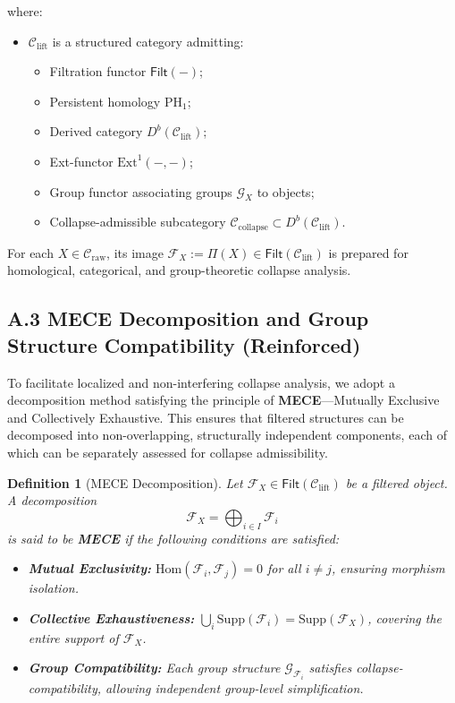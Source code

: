 \documentclass[11pt]{article}
\newtheorem{definition}[theorem]{Definition}
\begin{document}
where:

\begin{itemize}
    \item \( \mathcal{C}_{\mathrm{lift}} \) is a structured category admitting:
    \begin{itemize}
        \item Filtration functor \( \mathsf{Filt}(-) \);
        \item Persistent homology \( \mathrm{PH}_1 \);
        \item Derived category \( D^b(\mathcal{C}_{\mathrm{lift}}) \);
        \item Ext-functor \( \mathrm{Ext}^1(-, -) \);
        \item Group functor associating groups \( \mathcal{G}_X \) to objects;
        \item Collapse-admissible subcategory \( \mathcal{C}_{\mathrm{collapse}} \subset D^b(\mathcal{C}_{\mathrm{lift}}) \).
    \end{itemize}
\end{itemize}

For each \( X \in \mathcal{C}_{\mathrm{raw}} \), its image \( \mathcal{F}_X := \Pi(X) \in \mathsf{Filt}(\mathcal{C}_{\mathrm{lift}}) \) is prepared for homological, categorical, and group-theoretic collapse analysis.

\subsection*{A.3 MECE Decomposition and Group Structure Compatibility (Reinforced)}

To facilitate localized and non-interfering collapse analysis, we adopt a decomposition method satisfying the principle of \textbf{MECE}—Mutually Exclusive and Collectively Exhaustive. This ensures that filtered structures can be decomposed into non-overlapping, structurally independent components, each of which can be separately assessed for collapse admissibility.

\begin{definition}[MECE Decomposition]
Let \( \mathcal{F}_X \in \mathsf{Filt}(\mathcal{C}_{\mathrm{lift}}) \) be a filtered object. A decomposition 
\[
\mathcal{F}_X = \bigoplus_{i \in I} \mathcal{F}_i
\]
is said to be \textbf{MECE} if the following conditions are satisfied:
\begin{itemize}
    \item \textbf{Mutual Exclusivity:} \( \mathrm{Hom}(\mathcal{F}_i, \mathcal{F}_j) = 0 \) for all \( i \neq j \), ensuring morphism isolation.
    \item \textbf{Collective Exhaustiveness:} \( \bigcup_i \mathrm{Supp}(\mathcal{F}_i) = \mathrm{Supp}(\mathcal{F}_X) \), covering the entire support of \( \mathcal{F}_X \).
    \item \textbf{Group Compatibility:} Each group structure \( \mathcal{G}_{\mathcal{F}_i} \) satisfies collapse-compatibility, allowing independent group-level simplification.
\end{itemize}
\end{definition}
\end{document}
